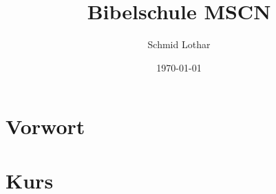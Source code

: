 \documentclass[a4paper, 11pt]{article}
\title{Bibelschule MSCN}
\author{Schmid Lothar}
\date{\today}
\begin{document}
\tableofcontents

\newpage
\section{Vorwort}

\section{Kurs}


%
\end{document}
